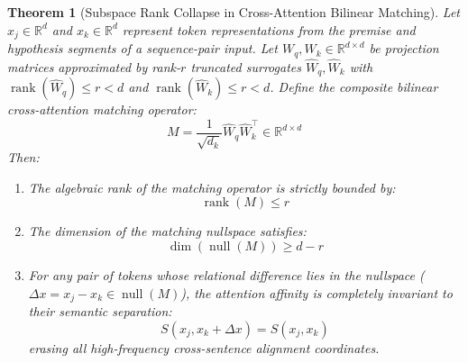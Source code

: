 \documentclass{article}
\newtheorem{theorem}{Theorem}
\begin{document}
\begin{theorem}[Subspace Rank Collapse in Cross-Attention Bilinear Matching]
\label{thm:subspace_rank_collapse}
Let $x_j \in \mathbb{R}^d$ and $x_k \in \mathbb{R}^d$ represent token representations from the premise and hypothesis segments of a sequence-pair input. Let $W_q, W_k \in \mathbb{R}^{d \times d}$ be projection matrices approximated by rank-$r$ truncated surrogates $\hat{W}_q, \hat{W}_k$ with $\operatorname{rank}(\hat{W}_q) \le r < d$ and $\operatorname{rank}(\hat{W}_k) \le r < d$. Define the composite bilinear cross-attention matching operator:
\begin{equation}
    M = \frac{1}{\sqrt{d_k}} \hat{W}_q \hat{W}_k^\top \in \mathbb{R}^{d \times d}
\end{equation}
Then:
\begin{enumerate}
    \item The algebraic rank of the matching operator is strictly bounded by:
    \begin{equation}
        \operatorname{rank}(M) \le r
    \end{equation}
    \item The dimension of the matching nullspace satisfies:
    \begin{equation}
        \operatorname{dim}(\operatorname{null}(M)) \ge d - r
    \end{equation}
    \item For any pair of tokens whose relational difference lies in the nullspace ($\Delta x = x_j - x_k \in \operatorname{null}(M)$), the attention affinity is completely invariant to their semantic separation:
    \begin{equation}
        S(x_j, x_k + \Delta x) = S(x_j, x_k)
    \end{equation}
    erasing all high-frequency cross-sentence alignment coordinates.
\end{enumerate}
\end{theorem}
\end{document}
